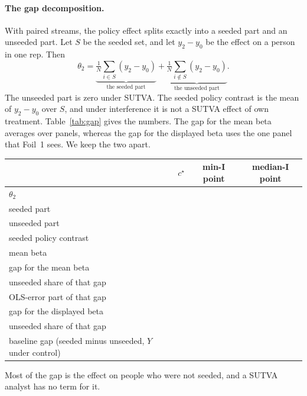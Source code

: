 \documentclass[11pt]{article}
\begin{document}
\paragraph{The gap decomposition.}
With paired streams, the policy effect splits exactly into a seeded
part and an unseeded part. Let $S$ be the seeded set, and let $y_2-y_0$
be the effect on a person in one rep. Then
\begin{equation}
  \theta_2
  = \underbrace{\tfrac{1}{N}\textstyle\sum_{i\in S}(y_2-y_0)}_{\text{the seeded part}}
  + \underbrace{\tfrac{1}{N}\textstyle\sum_{i\notin S}(y_2-y_0)}_{\text{the unseeded part}}.
\end{equation}
The unseeded part is zero under SUTVA. The seeded policy contrast is the
mean of $y_2-y_0$ over $S$, and under interference it is not a SUTVA effect of
own treatment. Table~\ref{tab:gap} gives the numbers. The gap for the
mean beta averages over \RepsEstimand{} panels, whereas the gap for the
displayed beta uses the one panel that Foil~1 sees. We keep the two
apart.
\begin{center}
\small
\setlength{\tabcolsep}{4pt}
\label{tab:gap}
\begin{tabular}{@{}lccc@{}}
\toprule
 & $c^\star$ & min-I point & median-I point \\
\midrule
$\theta_2$ & \ThetaTwoStar{} & \MinIThetaTwo{} & \MedIThetaTwo{} \\
seeded part & \StarPtSeededPart{} & \MinISeededPart{} & \MedISeededPart{} \\
unseeded part & \StarPtUnseededPart{} & \MinIUnseededPart{} & \MedIUnseededPart{} \\
seeded policy contrast & \StarPtSeededContrast{} & \MinISeededContrast{} & \MedISeededContrast{} \\
mean beta & \StarPtMeanBeta{} & \MinIMeanBeta{} & \MedIMeanBeta{} \\
gap for the mean beta & \StarPtGapMeanBeta{} & \MinIGapMeanBeta{} & \MedIGapMeanBeta{} \\
unseeded share of that gap & \StarPtUnseededShareMeanBeta{} & \MinIUnseededShareMeanBeta{} & \MedIUnseededShareMeanBeta{} \\
OLS-error part of that gap & \StarPtOlsErrorPart{} & \MinIOlsErrorPart{} & \MedIOlsErrorPart{} \\
gap for the displayed beta & \StarPtGapDisplayed{} & \MinIGapDisplayed{} & \MedIGapDisplayed{} \\
unseeded share of that gap & \StarPtUnseededShareDisplayed{} & \MinIUnseededShareDisplayed{} & \MedIUnseededShareDisplayed{} \\
baseline gap (seeded minus unseeded, $Y$ under control) & \StarPtBaselineGap{} & \MinIBaselineGap{} & \MedIBaselineGap{} \\
\bottomrule
\end{tabular}
\end{center}
Most of the gap is the effect on people who were not seeded, and a SUTVA
analyst has no term for it.
\end{document}
